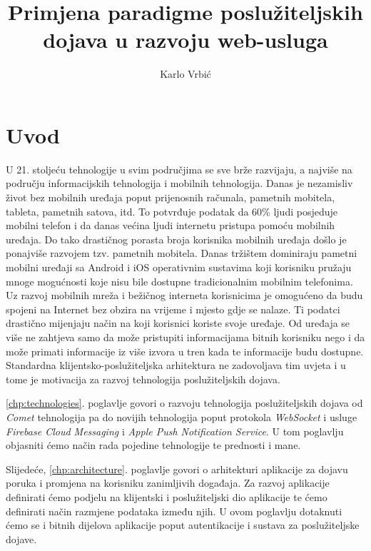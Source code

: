 \documentclass[times, utf8, zavrsni]{fer}
\begin{document}
\title{Primjena paradigme poslužiteljskih dojava u razvoju web-usluga}
\author{Karlo Vrbić}

\maketitle

\zahvala{}

\tableofcontents
\listoffigures

\chapter{Uvod}

U 21. stoljeću tehnologije u svim područjima se sve brže razvijaju, a najviše na području informacijskih tehnologija i mobilnih tehnologija. Danas je nezamisliv život bez mobilnih uređaja poput prijenosnih računala, pametnih mobitela, tableta, pametnih satova, itd. To potvrđuje podatak da 60\% ljudi posjeduje mobilni telefon i da danas većina ljudi internetu pristupa pomoću mobilnih uređaja. Do tako drastičnog porasta broja korisnika mobilnih uređaja došlo je ponajviše razvojem tzv. pametnih mobitela. Danas tržištem dominiraju pametni mobilni uređaji sa Android i iOS operativnim sustavima koji korisniku pružaju mnoge mogućnosti koje nisu bile dostupne tradicionalnim mobilnim telefonima. Uz razvoj mobilnih mreža i bežičnog interneta korisnicima je omogućeno da budu spojeni na Internet bez obzira na vrijeme i mjesto gdje se nalaze. Ti podatci drastično mijenjaju način na koji korisnici koriste svoje uređaje. Od uređaja se više ne zahtjeva samo da može pristupiti informacijama bitnih korisniku nego i da može primati informacije iz više izvora u tren kada te informacije budu dostupne. Standardna klijentsko-poslužiteljska arhitektura ne zadovoljava tim uvjeta i u tome je motivacija za razvoj tehnologija poslužiteljskih dojava.

\ref{chp:technologies}. poglavlje govori o razvoju tehnologija poslužiteljskih dojava od {\em Comet} tehnologija pa do novijih tehnologija poput protokola {\em WebSocket} i usluge {\em Firebase Cloud Messaging} i {\em Apple Push Notification Service}. U tom poglavlju objasniti ćemo način rada pojedine tehnologije te prednosti i mane.

Slijedeće, \ref{chp:architecture}. poglavlje govori o arhitekturi aplikacije za dojavu poruka i promjena na korisniku zanimljivih događaja. Za razvoj aplikacije definirati ćemo podjelu na klijentski i poslužiteljski dio aplikacije te ćemo definirati način razmjene podataka između njih. U ovom poglavlju dotaknuti ćemo se i bitnih dijelova aplikacije poput autentikacije i sustava za poslužiteljske dojave.
\end{document}
